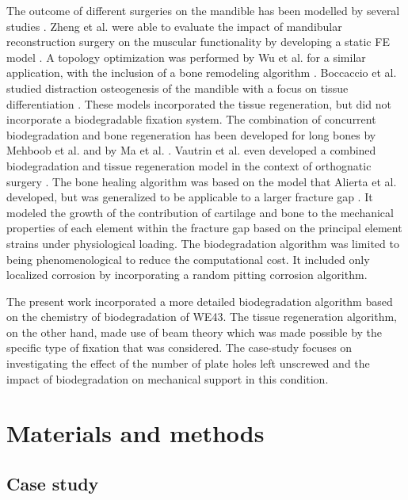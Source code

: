 The outcome of different surgeries on the mandible has been modelled by several studies \cite{Vautrin2021}. Zheng et al. were able to evaluate the impact of mandibular reconstruction surgery on the muscular functionality by developing a static FE model \cite{Zheng2019}. A topology optimization was performed by Wu et al. for a similar application, with the inclusion of a bone remodeling algorithm \cite{Wu2020}. Boccaccio et al. studied distraction osteogenesis of the mandible with a focus on tissue differentiation \cite{Boccaccio2008}. These models incorporated the tissue regeneration, but did not incorporate a biodegradable fixation system. The combination of concurrent biodegradation and bone regeneration has been developed for long bones by Mehboob et al. \cite{Mehboob2015} and by Ma et al. \cite{Ma2018}. Vautrin et al. even developed a combined biodegradation and tissue regeneration model in the context of orthognatic surgery \cite{Vautrin2021}. The bone healing algorithm was based on the model that Alierta et al. developed, but was generalized to be applicable to a larger fracture gap \cite{Alierta2013}. It modeled the growth of the contribution of cartilage and bone to the mechanical properties of each element within the fracture gap based on the principal element strains under physiological loading. The biodegradation algorithm was limited to being phenomenological to reduce the computational cost. It included only localized corrosion by incorporating a random pitting corrosion algorithm.

The present work incorporated a more detailed biodegradation algorithm based on the chemistry of biodegradation of WE43. The tissue regeneration algorithm, on the other hand, made use of beam theory which was made possible by the specific type of fixation that was considered. The case-study focuses on investigating the effect of the number of plate holes left unscrewed and the impact of biodegradation on mechanical support in this condition.


\section{Materials and methods}

\subsection{Case study}

